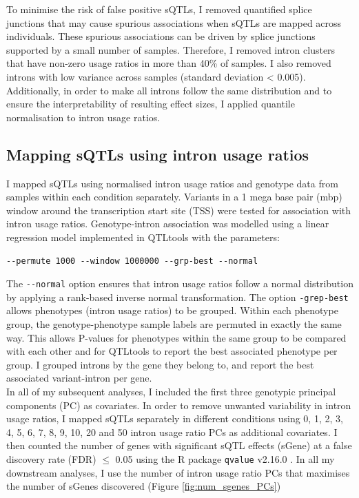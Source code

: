 To minimise the risk of false positive sQTLs, I removed quantified splice junctions that may cause spurious associations when sQTLs are mapped across individuals. These spurious associations can be driven by splice junctions supported by a small number of samples. Therefore, I removed intron clusters that have non-zero usage ratios in more than 40\% of samples. I also removed introns with low variance across samples (standard deviation < 0.005). Additionally, in order to make all introns follow the same distribution and to ensure the interpretability of resulting effect sizes, I applied quantile normalisation to intron usage ratios. %
\subsection{Mapping sQTLs using intron usage ratios}
I mapped sQTLs using normalised intron usage ratios and genotype data from samples within each condition separately. Variants in a 1 mega base pair (mbp) window around the transcription start site (TSS) were tested for association with intron usage ratios. Genotype-intron association was modelled using a linear regression model implemented in QTLtools \cite{Delaneau2017-dg} with the parameters:
\begin{verbatim}
--permute 1000 --window 1000000 --grp-best --normal
\end{verbatim}
The \Verb+--normal+ option ensures that intron usage ratios follow a normal distribution by applying a rank-based inverse normal transformation. The option \Verb+-grep-best+ allows phenotypes (intron usage ratios) to be grouped. Within each phenotype group, the genotype-phenotype sample labels are permuted in exactly the same way. This allows P-values for phenotypes within the same group to be compared with each other and for QTLtools to report the best associated phenotype per group. I grouped introns by the gene they belong to, and report the best associated variant-intron per gene. \\

In all of my subsequent analyses, I included the first three genotypic principal components (PC) as covariates. In order to remove unwanted variability in intron usage ratios, I mapped sQTLs separately in different conditions using 0, 1, 2, 3, 4, 5, 6, 7, 8, 9, 10, 20 and 50  intron usage ratio PCs as additional covariates. I then counted the number of genes with significant sQTL effects (sGene) at a false discovery rate (FDR) $\leq$ 0.05 using the R package \Verb+qvalue+ v2.16.0 \cite{Storey2003-zd}. In all my downstream analyses, I use the number of intron usage ratio PCs that maximises the number of sGenes discovered (Figure \ref{fig:num_sgenes_PCs})


